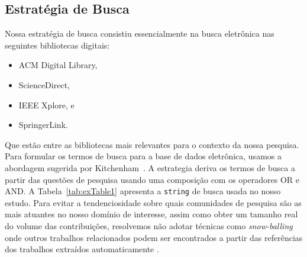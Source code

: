 \subsection{Estratégia de Busca}\label{estrategia_busca}
Nossa estratégia de busca consistiu essencialmente na busca eletrônica nas seguintes bibliotecas digitais: 
\begin{itemize}
\item ACM Digital Library, 
\item ScienceDirect, 
\item IEEE Xplore, e 
\item SpringerLink.
\end{itemize} 

\noindent Que estão entre as bibliotecas mais relevantes para o contexto da nossa pesquisa. Para formular os termos de busca para a base de dados eletrônica, usamos a abordagem sugerida por Kitchenham~\cite{kitchenham:techReport2007,budgen:ppig2008}. A estrategia 
deriva os termos de busca a partir das questões de pesquisa usando uma composição com os operadores OR e AND. A  Tabela~\ref{tab:exTable1} apresenta a \texttt{string} de busca usada no nosso estudo. Para evitar a tendenciosidade sobre quais comunidades de pesquisa s\~{a}o as mais atuantes no nosso dom\'{i}nio de interesse, assim como obter um tamanho real do volume das contribuições, resolvemos não adotar técnicas como \emph{snow-balling} onde outros trabalhos relacionados podem ser encontrados a partir das referências dos trabalhos extraídos automaticamente \cite{budgen:ppig2008}.

